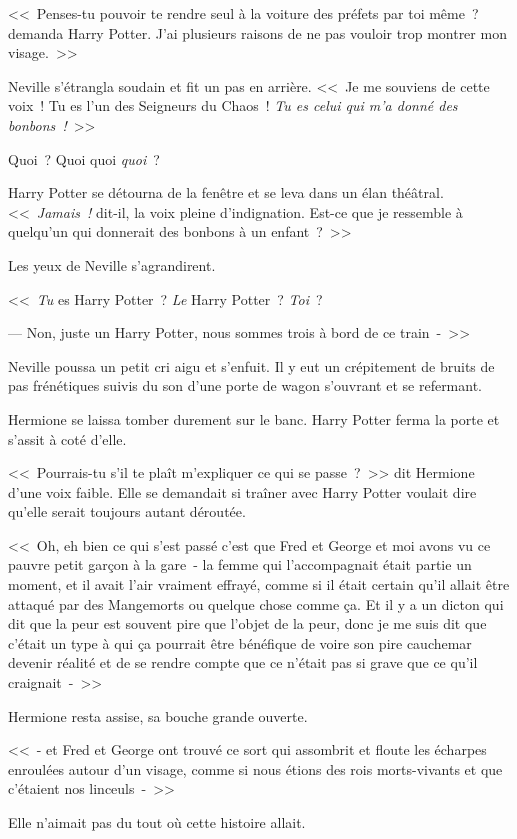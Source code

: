 <<~Penses-tu pouvoir te rendre seul à la voiture des préfets par toi même~? demanda Harry Potter. J'ai plusieurs raisons de ne pas vouloir trop montrer mon visage.~>>

Neville s'étrangla soudain et fit un pas en arrière. <<~Je me souviens de cette voix~! Tu es l'un des Seigneurs du Chaos~! \emph{Tu es celui qui m'a donné des bonbons~!}~>>

Quoi~? Quoi quoi \emph{quoi}~?

Harry Potter se détourna de la fenêtre et se leva dans un élan théâtral. <<~\emph{Jamais~!} dit-il, la voix pleine d'indignation. Est-ce que je ressemble à quelqu'un qui donnerait des bonbons à un enfant~?~>>

Les yeux de Neville s'agrandirent.

<<~\emph{Tu} es Harry Potter~? \emph{Le} Harry Potter~? \emph{Toi}~?

--- Non, juste un Harry Potter, nous sommes trois à bord de ce train~-~>>

Neville poussa un petit cri aigu et s'enfuit. Il y eut un crépitement de bruits de pas frénétiques suivis du son d'une porte de wagon s'ouvrant et se refermant.

Hermione se laissa tomber durement sur le banc. Harry Potter ferma la porte et s'assit à coté d'elle.

<<~Pourrais-tu s'il te plaît m'expliquer ce qui se passe~?~>> dit Hermione d'une voix faible. Elle se demandait si traîner avec Harry Potter voulait dire qu'elle serait toujours autant déroutée.

<<~Oh, eh bien ce qui s'est passé c'est que Fred et George et moi avons vu ce pauvre petit garçon à la gare~- la femme qui l'accompagnait était partie un moment, et il avait l'air vraiment effrayé, comme si il était certain qu'il allait être attaqué par des Mangemorts ou quelque chose comme ça. Et il y a un dicton qui dit que la peur est souvent pire que l'objet de la peur, donc je me suis dit que c'était un type à qui ça pourrait être bénéfique de voire son pire cauchemar devenir réalité et de se rendre compte que ce n'était pas si grave que ce qu'il craignait~-~>>

Hermione resta assise, sa bouche grande ouverte.

<<~- et Fred et George ont trouvé ce sort qui assombrit et floute les écharpes enroulées autour d'un visage, comme si nous étions des rois morts-vivants et que c'étaient nos linceuls~-~>>

Elle n'aimait pas du tout où cette histoire allait.


